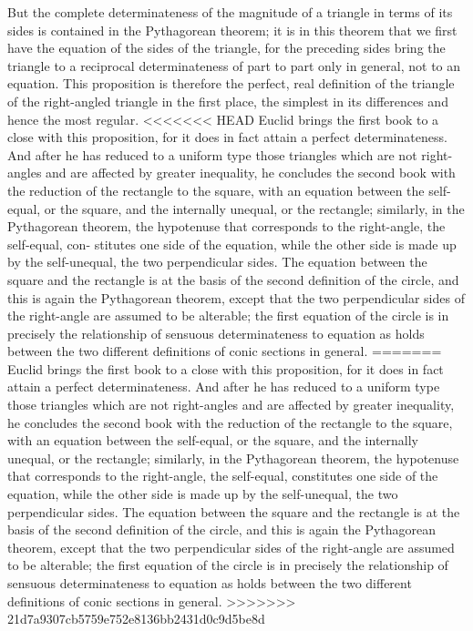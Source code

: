 But the complete determinateness of
the magnitude of a triangle in terms of its sides
is contained in the Pythagorean theorem;
it is in this theorem that we first have
the equation of the sides of the triangle,
for the preceding sides bring the triangle
to a reciprocal determinateness of
part to part only in general, not to an equation.
This proposition is therefore the perfect,
real definition of the triangle
of the right-angled triangle in the first place,
the simplest in its differences and hence the most regular.
<<<<<<< HEAD
Euclid brings
the first book to a close with this proposition, for it does in fact attain a
perfect determinateness. And after he has reduced to a uniform type those
triangles which are not right-angles and are affected by greater inequality,
he concludes the second book with the reduction of the rectangle to the
square, with an equation between the self-equal, or the square, and the
internally unequal, or the rectangle; similarly, in the Pythagorean theorem,
the hypotenuse that corresponds to the right-angle, the self-equal, con-
stitutes one side of the equation, while the other side is made up by the
self-unequal, the two perpendicular sides. The equation between the square
and the rectangle is at the basis of the second definition of the circle, and
this is again the Pythagorean theorem, except that the two perpendicular
sides of the right-angle are assumed to be alterable; the first equation of the
circle is in precisely the relationship of sensuous determinateness to equation
as holds between the two different definitions of conic sections in general.
=======
Euclid brings the first book to a close with this proposition,
for it does in fact attain a perfect determinateness.
And after he has reduced to a uniform type
those triangles which are not right-angles
and are affected by greater inequality,
he concludes the second book with
the reduction of the rectangle to the square,
with an equation between the self-equal, or the square,
and the internally unequal, or the rectangle;
similarly, in the Pythagorean theorem,
the hypotenuse that corresponds to the right-angle, the self-equal,
constitutes one side of the equation,
while the other side is made up by the self-unequal,
the two perpendicular sides.
The equation between the square and the rectangle is
at the basis of the second definition of the circle,
and this is again the Pythagorean theorem,
except that the two perpendicular sides of
the right-angle are assumed to be alterable;
the first equation of the circle is in precisely
the relationship of sensuous determinateness to
equation as holds between the two different
definitions of conic sections in general.
>>>>>>> 21d7a9307cb5759e752e8136bb2431d0c9d5be8d

